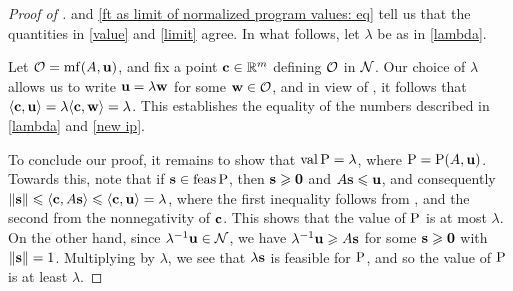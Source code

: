 \documentclass{amsart}
\begin{document}
\begin{proof}[Proof of ]
  and \eqref{ft as limit of normalized program values: eq} tell us that the quantities in \ref{value} and \ref{limit} agree.  In what follows, let $\lambda$ be as in \ref{lambda}.


    Let $\mathcal{O} = \operatorname{mf}(A,\mathbf{u})$, and fix a point $\mathbf{c} \in \mathbb{R}^m$ defining $\mathcal{O}$ in $\mathcal{N}$.  Our choice of $\lambda$ allows us to write
    $\mathbf{u} = \lambda \mathbf{w}$ for some $\mathbf{w} \in \mathcal{O}$,  and in view of , it follows that $\langle \mathbf{c}, \mathbf{u} \rangle = \lambda \langle \mathbf{c}, \mathbf{w} \rangle = \lambda$.
    This establishes the equality of the numbers described in \ref{lambda} and \ref{new ip}.

    To conclude our proof,  it remains to show that $\operatorname{val} \mathrm{P} = \lambda$, where $\mathrm{P} = \mathrm{P}(A, \mathbf{u})$.  Towards this, note that if $\mathbf{s} \in \operatorname{feas} \mathrm{P}$, then $\mathbf{s}\geqslant \mathbf{0}$ and $A \mathbf{s} \leqslant \mathbf{u}$, and consequently
  $\| \mathbf{s} \| \leqslant \langle \mathbf{c}, A \mathbf{s} \rangle \leqslant \langle \mathbf{c}, \mathbf{u} \rangle = \lambda$,
   where the first inequality follows from , and the second from the nonnegativity of $\mathbf{c}$.
   This shows that the value of $\mathrm{P}$ is at most $\lambda$.
   On the other hand, since $\lambda^{-1}\mathbf{u} \in \mathcal{N}$, we have $\lambda^{-1}\mathbf{u} \geqslant A\mathbf{s}$ for some $\mathbf{s} \geqslant \mathbf{0}$ with $\| \mathbf{s} \| = 1$.
   Multiplying by $\lambda$, we see that  $\lambda\mathbf{s}$ is feasible for $\mathrm{P}$, and so the value of $\mathrm{P}$ is at least $\lambda$.
\end{proof}
\end{document}
